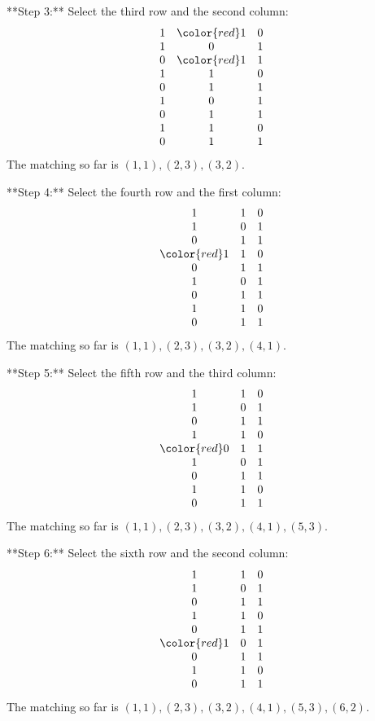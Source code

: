 **Step 3:**
Select the third row and the second column:
\[
\begin{array}{ccc}
1 & \color{red}1 & 0 \\
1 & 0 & 1 \\
0 & \color{red}1 & 1 \\
1 & 1 & 0 \\
0 & 1 & 1 \\
1 & 0 & 1 \\
0 & 1 & 1 \\
1 & 1 & 0 \\
0 & 1 & 1 \\
\end{array}
\]
The matching so far is \((1,1), (2,3), (3,2)\).

**Step 4:**
Select the fourth row and the first column:
\[
\begin{array}{ccc}
1 & 1 & 0 \\
1 & 0 & 1 \\
0 & 1 & 1 \\
\color{red}1 & 1 & 0 \\
0 & 1 & 1 \\
1 & 0 & 1 \\
0 & 1 & 1 \\
1 & 1 & 0 \\
0 & 1 & 1 \\
\end{array}
\]
The matching so far is \((1,1), (2,3), (3,2), (4,1)\).

**Step 5:**
Select the fifth row and the third column:
\[
\begin{array}{ccc}
1 & 1 & 0 \\
1 & 0 & 1 \\
0 & 1 & 1 \\
1 & 1 & 0 \\
\color{red}0 & 1 & 1 \\
1 & 0 & 1 \\
0 & 1 & 1 \\
1 & 1 & 0 \\
0 & 1 & 1 \\
\end{array}
\]
The matching so far is \((1,1), (2,3), (3,2), (4,1), (5,3)\).

**Step 6:**
Select the sixth row and the second column:
\[
\begin{array}{ccc}
1 & 1 & 0 \\
1 & 0 & 1 \\
0 & 1 & 1 \\
1 & 1 & 0 \\
0 & 1 & 1 \\
\color{red}1 & 0 & 1 \\
0 & 1 & 1 \\
1 & 1 & 0 \\
0 & 1 & 1 \\
\end{array}
\]
The matching so far is \((1,1), (2,3), (3,2), (4,1), (5,3), (6,2)\).

